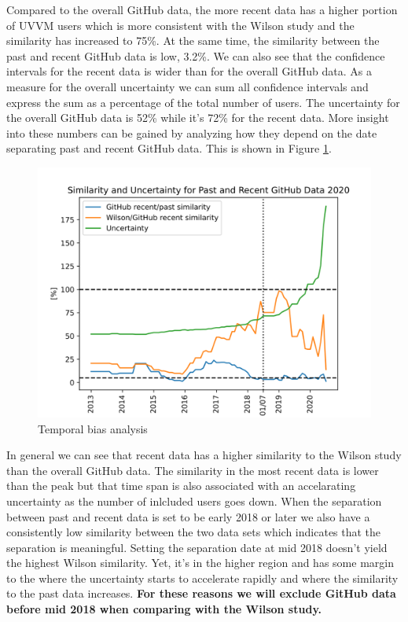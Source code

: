 \documentclass[]{article}
\begin{document}
Compared to the overall GitHub data, the more recent data has a higher portion of UVVM users which is more consistent with the Wilson study and the similarity has increased to 75\%. At the same time, the similarity between the past and recent GitHub data is low, 3.2\%. We can also see that the confidence intervals for the recent data is wider than for the overall GitHub data. As a measure for the overall uncertainty we can sum all confidence intervals and express the sum as a percentage of the total number of users. The uncertainty for the overall GitHub data is 52\% while it's 72\% for the recent data. More insight into these numbers can be gained by analyzing how they depend on the date separating past and recent GitHub data. This is shown in Figure \ref{fig:temporal-bias-analysis-2020}.

\begin{figure}

{\centering \includegraphics[width=1\linewidth]{img/temporal_bias_analysis_2020} 

}

\caption{Temporal bias analysis}\label{fig:temporal-bias-analysis-2020}
\end{figure}

In general we can see that recent data has a higher similarity to the Wilson study than the overall GitHub data. The similarity in the most recent data is lower than the peak but that time span is also associated with an accelarating uncertainty as the number of inlcluded users goes down. When the separation between past and recent data is set to be early 2018 or later we also have a consistently low similarity between the two data sets which indicates that the separation is meaningful. Setting the separation date at mid 2018 doesn't yield the highest Wilson similarity. Yet, it's in the higher region and has some margin to the where the uncertainty starts to accelerate rapidly and where the similarity to the past data increases. \textbf{For these reasons we will exclude GitHub data before mid 2018 when comparing with the Wilson study.}
\end{document}
